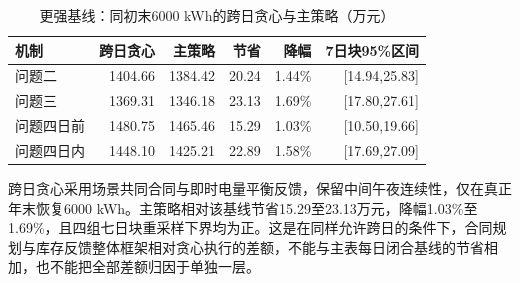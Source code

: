 \begin{table}[H]\centering\small
\caption{更强基线：同初末6000 kWh的跨日贪心与主策略（万元）}
\begin{tabular}{lrrrrr}\toprule
机制&跨日贪心&主策略&节省&降幅&7日块95\%区间\\\midrule
问题二 & 1404.66 & 1384.42 & 20.24 & 1.44\% & [14.94,25.83] \\
问题三 & 1369.31 & 1346.18 & 23.13 & 1.69\% & [17.80,27.61] \\
问题四日前 & 1480.75 & 1465.46 & 15.29 & 1.03\% & [10.50,19.66] \\
问题四日内 & 1448.10 & 1425.21 & 22.89 & 1.58\% & [17.69,27.09] \\
\bottomrule\end{tabular}\end{table}
跨日贪心采用场景共同合同与即时电量平衡反馈，保留中间午夜连续性，仅在真正年末恢复6000 kWh。主策略相对该基线节省15.29至23.13万元，降幅1.03\%至1.69\%，且四组七日块重采样下界均为正。这是在同样允许跨日的条件下，合同规划与库存反馈整体框架相对贪心执行的差额，不能与主表每日闭合基线的节省相加，也不能把全部差额归因于单独一层。
